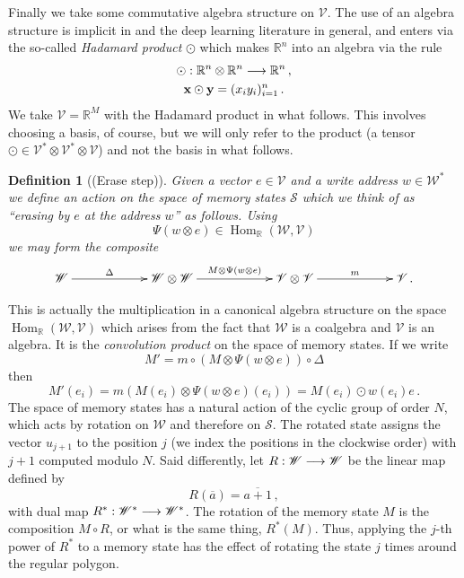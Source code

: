 \documentclass[english,letter paper,12pt,leqno]{article}
\theoremstyle{example}
\newtheorem{definition}[theorem]{Definition}
\numberwithin{equation}{section}
\def\Hom{\operatorname{Hom}}
\begin{document}
Finally we take some commutative algebra structure on $\mathscr{V}$. The use of an algebra structure is implicit in \cite{ntm} and the deep learning literature in general, and enters  via the so-called \emph{Hadamard product} $\odot$ which makes $\mathbb{R}^n$ into an algebra via the rule
\begin{gather*}
\odot: \mathbb{R}^n \otimes \mathbb{R}^n \longrightarrow \mathbb{R}^n\,,\\
\bold{x} \odot \bold{y} = ( x_i y_i )_{i=1}^n\,.
\end{gather*}
We take $\mathscr{V} = \mathbb{R}^M$ with the Hadamard product in what follows. This involves choosing a basis, of course, but we will only refer to the product (a tensor $\odot \in \mathscr{V}^* \otimes \mathscr{V}^* \otimes \mathscr{V}$) and not the basis in what follows.

\begin{definition}[(Erase step)] Given a vector $e \in \mathscr{V}$ and a write address $w \in \mathscr{W}^*$ we define an action on the space of memory states $\mathscr{S}$ which we think of as ``erasing by $e$ at the address $w$'' as follows. Using
\[
\Psi( w \otimes e ) \in \Hom_{\mathbb{R}}(\mathscr{W}, \mathscr{V})
\]
we may form the composite
\[
\xymatrix@C+3pc{
\mathscr{W} \ar[r]^-{\Delta} & \mathscr{W} \otimes \mathscr{W} \ar[r]^-{M \otimes \Psi( w \otimes e )} & \mathscr{V} \otimes \mathscr{V} \ar[r]^-{m} & \mathscr{V}\,.
}
\]
\end{definition}

This is actually the multiplication in a canonical algebra structure on the space $\Hom_{\mathbb{R}}(\mathscr{W}, \mathscr{V})$ which arises from the fact that $\mathscr{W}$ is a coalgebra and $\mathscr{V}$ is an algebra. It is the \emph{convolution product} on the space of memory states. If we write
\[
M' = m \circ (M \otimes \Psi( w \otimes e )) \circ \Delta
\]
then 
\[
M'(e_i) = m \left( M(e_i) \otimes \Psi( w \otimes e )(e_i) \right) = M(e_i) \odot w(e_i) e\,.
\]
The space of memory states has a natural action of the cyclic group of order $N$, which acts by rotation on $\mathscr{W}$ and therefore on $\mathscr{S}$. The rotated state assigns the vector $u_{j+1}$ to the position $j$ (we index the positions in the clockwise order) with $j + 1$ computed modulo $N$. Said differently, let $R: \mathscr{W} \longrightarrow \mathscr{W}$ be the linear map defined by
\[
R( \overline{a} ) = \overline{a+1}\,,
\]
with dual map $R^*: \mathscr{W}^* \longrightarrow \mathscr{W}^*$. The rotation of the memory state $M$ is the composition $M \circ R$, or what is the same thing, $R^*( M )$. Thus, applying the $j$-th power of $R^*$ to a memory state has the effect of rotating the state $j$ times around the regular polygon.
\end{document}
